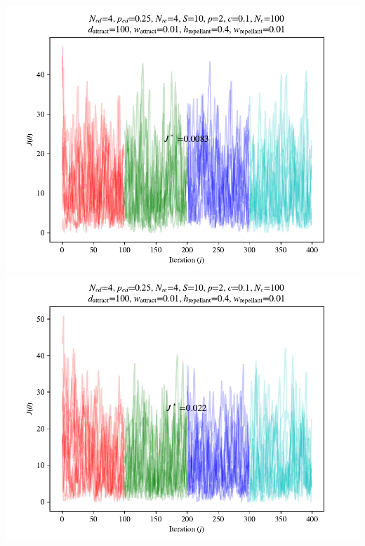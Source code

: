 \documentclass{beamer}
\begin{document}
\begin{frame}
\begin{columns}
\begin{center}
    \includegraphics[scale=0.3]{assets/rastrigin_colony_ed_2_J}
    \includegraphics[scale=0.3]{assets/rastrigin_colony_ed_3_J}
  \end{center}
\end{columns}
\end{frame}
\end{document}
